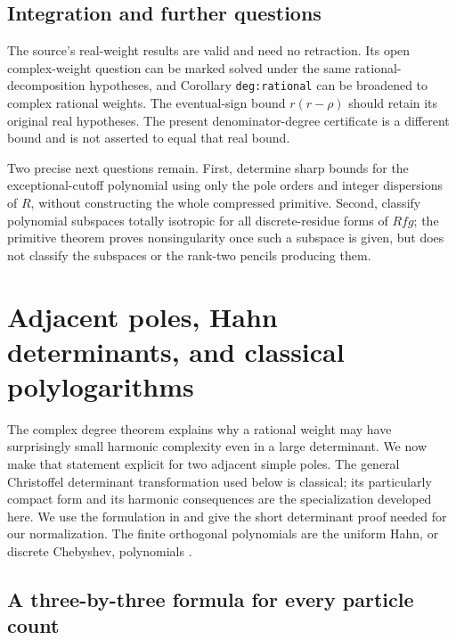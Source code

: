 \documentclass[11pt,a4paper]{article}
\theoremstyle{definition}
\theoremstyle{remark}
\numberwithin{equation}{section}
\begin{document}
\subsection{Integration and further questions}

The source's real-weight results are valid and need no retraction.
Its open complex-weight question can be marked solved under the
same rational-decomposition hypotheses, and Corollary
\texttt{deg:rational} can be broadened to complex rational weights.
The eventual-sign bound $r(r-\rho)$ should retain its original real
hypotheses.  The present denominator-degree certificate is a
different bound and is not asserted to equal that real bound.

Two precise next questions remain.  First, determine sharp bounds
for the exceptional-cutoff polynomial using only the pole orders and
integer dispersions of $R$, without constructing the whole compressed
primitive.  Second, classify polynomial subspaces totally isotropic
for all discrete-residue forms of $Rfg$; the primitive theorem proves
nonsingularity once such a subspace is given, but does not classify
the subspaces or the rank-two pencils producing them.



\section{Adjacent poles, Hahn determinants, and classical polylogarithms}
\label{hp:section}

The complex degree theorem explains why a rational weight may have
surprisingly small harmonic complexity even in a large determinant.
We now make that statement explicit for two adjacent simple poles.
The general Christoffel determinant transformation used below is
classical; its particularly compact form and its harmonic consequences
are the specialization developed here. We use the formulation in
\cite{Krattenthaler2023} and give the short determinant proof needed
for our normalization. The finite orthogonal polynomials are the
uniform Hahn, or discrete Chebyshev, polynomials
\cite[Sections 18.19--18.20]{DLMF}.

\subsection{A three-by-three formula for every particle count}
\end{document}
